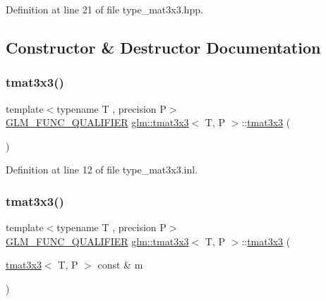 Definition at line 21 of file type\+\_\+mat3x3.\+hpp.



\subsection{Constructor \& Destructor Documentation}
\mbox{\label{structglm_1_1tmat3x3_ac20c2aecd1be84bcae07e30b0e1dc28d}} 
\subsubsection{\texorpdfstring{tmat3x3()}{tmat3x3()}\hspace{0.1cm}{\footnotesize\ttfamily [1/22]}}
{\footnotesize\ttfamily template$<$typename T , precision P$>$ \\
\mbox{\hyperlink{setup_8hpp_a33fdea6f91c5f834105f7415e2a64407}{G\+L\+M\+\_\+\+F\+U\+N\+C\+\_\+\+Q\+U\+A\+L\+I\+F\+I\+ER}} \mbox{\hyperlink{structglm_1_1tmat3x3}{glm\+::tmat3x3}}$<$ T, P $>$\+::\mbox{\hyperlink{structglm_1_1tmat3x3}{tmat3x3}} (\begin{DoxyParamCaption}{ }\end{DoxyParamCaption})}



Definition at line 12 of file type\+\_\+mat3x3.\+inl.

\mbox{\label{structglm_1_1tmat3x3_a0b809e3ca9e9a52ee512517df570a6d8}} 
\subsubsection{\texorpdfstring{tmat3x3()}{tmat3x3()}\hspace{0.1cm}{\footnotesize\ttfamily [2/22]}}
{\footnotesize\ttfamily template$<$typename T , precision P$>$ \\
\mbox{\hyperlink{setup_8hpp_a33fdea6f91c5f834105f7415e2a64407}{G\+L\+M\+\_\+\+F\+U\+N\+C\+\_\+\+Q\+U\+A\+L\+I\+F\+I\+ER}} \mbox{\hyperlink{structglm_1_1tmat3x3}{glm\+::tmat3x3}}$<$ T, P $>$\+::\mbox{\hyperlink{structglm_1_1tmat3x3}{tmat3x3}} (\begin{DoxyParamCaption}\item[{\mbox{\hyperlink{structglm_1_1tmat3x3}{tmat3x3}}$<$ T, P $>$ const \&}]{m }\end{DoxyParamCaption})}




